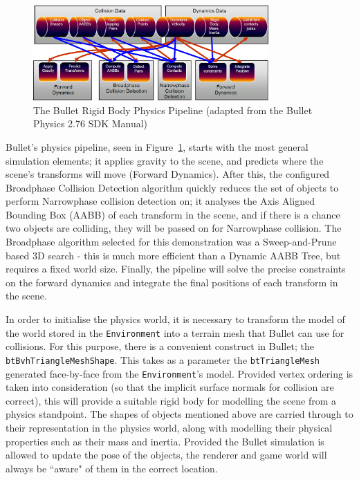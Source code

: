 \documentclass[a4paper,10pt]{report}
\begin{document}
\begin{figure}
  \begin{center}
    \includegraphics[width=340px]{BulletPipeline}
  \end{center}
  \caption[The Bullet Rigid Body Physics Pipeline]{The Bullet Rigid Body Physics Pipeline (adapted from the Bullet Physics 2.76 SDK Manual)}
  \label{bulletpipe}
\end{figure} 

Bullet's physics pipeline, seen in Figure~\ref{bulletpipe}, starts with the most general simulation elements; it applies gravity to the scene, and predicts where the scene's transforms will move (Forward Dynamics). After this, the configured Broadphase Collision Detection algorithm quickly reduces the set of objects to perform Narrowphase collision detection on; it analyses the Axis Aligned Bounding Box (AABB) of each transform in the scene, and if there is a chance two objects are colliding, they will be passed on for Narrowphase collision. The Broadphase algorithm selected for this demonstration was a Sweep-and-Prune based 3D search - this is much more efficient than a Dynamic AABB Tree, but requires a fixed world size. Finally, the pipeline will solve the precise constraints on the forward dynamics and integrate the final positions of each transform in the scene.

In order to initialise the physics world, it is necessary to transform the model of the world stored in the \texttt{Environment} into a terrain mesh that Bullet can use for collisions. For this purpose, there is a convenient construct in Bullet; the \texttt{btBvhTriangleMeshShape}. This takes as a parameter the \texttt{btTriangleMesh} generated face-by-face from the \texttt{Environment}'s model. Provided vertex ordering is taken into consideration (so that the implicit surface normals for collision are correct), this will provide a suitable rigid body for modelling the scene from a physics standpoint. The shapes of objects mentioned above are carried through to their representation in the physics world, along with modelling their physical properties such as their mass and inertia. Provided the Bullet simulation is allowed to update the pose of the objects, the renderer and game world will always be ``aware" of them in the correct location.
\end{document}

